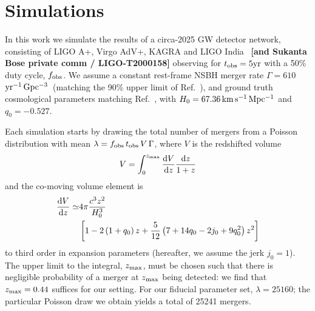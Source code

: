 \documentclass[%
 reprint,
 superscriptaddress,
 nofootinbib,
 amsmath,amssymb,
 aps,
]{revtex4-2}
\newcommand{\hubble}{\ensuremath{H_0}}
\newcommand{\decel}{\ensuremath{q_0}}
\newcommand{\jerk}{\ensuremath{j_0}}
\newcommand{\zmax}{\ensuremath{z_{\rm max}}}
\newcommand{\tobs}{t_{\rm obs}}
\newcommand{\fobs}{f_{\rm obs}}
\newcommand{\kmsmpc}{\ensuremath{{\rm km\,s^{-1}\,Mpc^{-1}}}}
\newcommand{\yr}{\ensuremath{{\rm yr}}}
\newcommand{\yrgpc}{\ensuremath{{\rm yr^{-1}\,Gpc^{-3}}}}
\begin{document}

\section{Simulations} \label{sec:sims}

In this work we simulate the results of a circa-2025 GW detector network, consisting of LIGO A+, Virgo AdV+, KAGRA and LIGO India~\cite{Abbott_etal:2013} {\bf [and Sukanta Bose private comm / LIGO-T2000158]} observing for $\tobs = 5 \yr$ with a 50\% duty cycle, $\fobs$. We assume a constant rest-frame  NSBH merger rate $\Gamma = 610$ \yrgpc\ (matching the 90\% upper limit of Ref.~\cite{Ligo:2018}), and ground truth cosmological parameters matching Ref.~\cite{Planck_VI:2018}, with $\hubble=67.36\,\kmsmpc$ and $\decel=-0.527$.


Each simulation starts by drawing the total number of mergers from a Poisson distribution with mean $\lambda = \fobs \, \tobs \, V \, \Gamma $, where $V$ is the redshifted volume
\begin{equation}
V = \int_0^{\zmax} \frac{{\rm d}V}{{\rm d}z} \frac{{\rm d}z}{1+z}
\end{equation}
and the co-moving volume element is
\begin{align}
\frac{{\rm d}V}{{\rm d}z} \simeq & 4\pi \frac{c^3 z^2}{\hubble^3} \\
& \left[1 - 2 \left(1 + \decel \right) z + \frac{5}{12} \left(7 + 14 \decel - 2 \jerk + 9 \decel^2 \right) z^2 \right] \nonumber
\end{align}
to third order in expansion parameters (hereafter, we assume the jerk $j_0 = 1$). The upper limit to the integral, $\zmax$, must be chosen such that there is negligible probability of a merger at $\zmax$ being detected: we find that $\zmax=0.44$ suffices for our setting. For our fiducial parameter set, $\lambda = 25160$; the particular Poisson draw we obtain yields a total of 25241 mergers.
\end{document}
